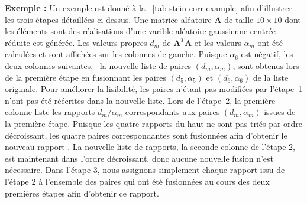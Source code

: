     \bigskip\noindent%
    \textbf{Exemple :} Un exemple est donné à la \tabname~\ref{tab-stein-corr-example} afin d'illustrer les trois étapes détaillées ci-dessus. Une matrice aléatoire $\mathbf{A}$ de taille $10\times 10$ dont les éléments sont des réalisations d'une varible aléatoire gaussienne centrée réduite est générée. Les valeurs propres $d_m$ de $\mathbf{A}^T\mathbf{A}$ et les valeurs $\alpha_m$ ont été calculées et sont affichées sur les colonnes de gauche. Puisque $\alpha_6$ est négatif, les deux colonnes suivantes, \ie\ la nouvelle liste de paires $(d_m, \alpha_m)$, sont obtenus lors de la première étape en fusionnant les paires $(d_5, \alpha_5)$ et $(d_6,\alpha_6)$ de la liste originale. Pour améliorer la lisibilité, les paires n'étant pas modifiées par l'étape~1 n'ont pas été réécrites dans la nouvelle liste. Lors de l'étape~2, la première colonne liste les rapports $d_m/\alpha_m$ correspondants aux paires $(d_m, \alpha_m)$ issues de la première étape. Puisque les quatre rapports du haut ne sont pas triés par ordre décroissant, les quatre paires correspondantes sont fusionnées afin d'obtenir le nouveau rapport . La nouvelle liste de rapports, \ie{} la seconde colonne de l'étape 2, est maintenant dans l'ordre décroissant, donc aucune nouvelle fusion n'est nécessaire. Dans l'étape 3, nous assignons simplement chaque rapport issu de l'étape 2 à l'ensemble des paires qui ont été fusionnées au cours des deux premières étapes afin d'obtenir ce rapport.
    
    
    
